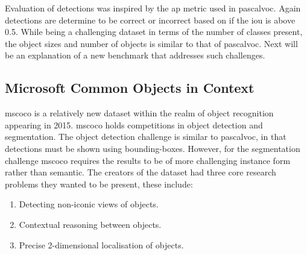 Evaluation of detections was inspired by the \gls{ap} metric used in \gls{pascalvoc}. Again detections are determine to be correct or incorrect based on if the \gls{iou} is above 0.5. 
While being a challenging dataset in terms of the number of classes present, the object sizes and number of objects is similar to that of \gls{pascalvoc}. Next will be an explanation of a new benchmark that addresses such challenges.



\subsection{Microsoft Common Objects in Context}
\gls{mscoco} \cite{mscoco} is a relatively new dataset within the realm of object recognition appearing in 2015. \gls{mscoco} holds competitions in object detection and segmentation. The object detection challenge is similar to \gls{pascalvoc}, in that detections must be shown using bounding-boxes. However, for the segmentation challenge \gls{mscoco} requires the results to be of more challenging instance form rather than semantic. The creators of the dataset had three core research problems they wanted to be present, these include:

\begin{enumerate}
	\item Detecting non-iconic views of objects.
	\item Contextual reasoning between objects.
	\item Precise 2-dimensional localisation of objects.
\end{enumerate}

